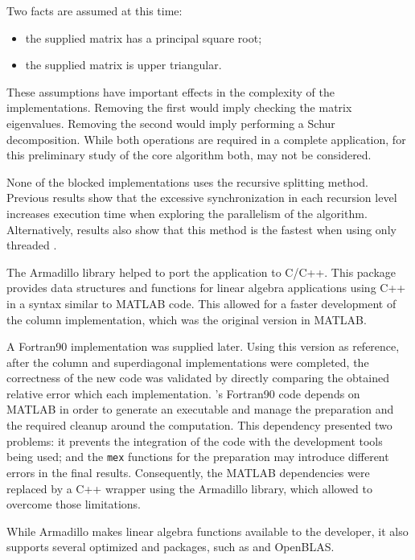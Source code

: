 Two facts are assumed at this time:
\begin{itemize}
	\item the supplied matrix has a principal square root;
	\item the supplied matrix is upper triangular.
\end{itemize}
These assumptions have important effects in the complexity of the implementations. Removing the first would imply checking the matrix eigenvalues. Removing the second would imply performing a Schur decomposition. While both operations are required in a complete application, for this preliminary study of the core algorithm both, may not be considered.

None of the blocked implementations uses the recursive splitting method. Previous results show that the excessive synchronization in each recursion level increases execution time when exploring the parallelism of the algorithm. Alternatively, results also show that this method is the fastest when using only threaded \blas.

The Armadillo library \cite{Armadillo:2010} helped to port the application to C/C++. This package provides data structures and functions for linear algebra applications using C++ in a syntax similar to MATLAB code. This allowed for a faster development of the column implementation, which was the original version in MATLAB.

A Fortran90 implementation was supplied later. Using this version as reference, after the column and superdiagonal implementations were completed, the correctness of the new code was validated by directly comparing the obtained relative error which each implementation. \nag's Fortran90 code depends on MATLAB in order to generate an executable and manage the preparation and the required cleanup around the computation. This dependency presented two problems: it prevents the integration of the code with the development tools being used; and the \texttt{mex} functions for the preparation may introduce different errors in the final results. Consequently, the MATLAB dependencies were replaced by a C++ wrapper using the Armadillo library, which allowed to overcome those limitations.

While Armadillo makes linear algebra functions available to the developer, it also supports several optimized \blas and \lapack packages, such as \intel\mkl and OpenBLAS.


